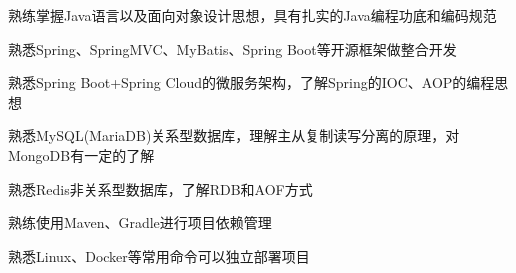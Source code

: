 

\begin{cventries}

  \cventry
    {} %
    {} %
    {} %
    {} %
    {
      \begin{cvitems} %
      	\item {熟练掌握Java语言以及面向对象设计思想，具有扎实的Java编程功底和编码规范}
      	\item {熟悉Spring、SpringMVC、MyBatis、Spring Boot等开源框架做整合开发}
        \item {熟悉Spring Boot+Spring Cloud的微服务架构，了解Spring的IOC、AOP的编程思想}
        \item {熟悉MySQL(MariaDB)关系型数据库，理解主从复制读写分离的原理，对MongoDB有一定的了解}
        \item {熟悉Redis非关系型数据库，了解RDB和AOF方式}
        \item {熟练使用Maven、Gradle进行项目依赖管理}
        \item {熟悉Linux、Docker等常用命令可以独立部署项目}
      \end{cvitems}
    }

\end{cventries}
